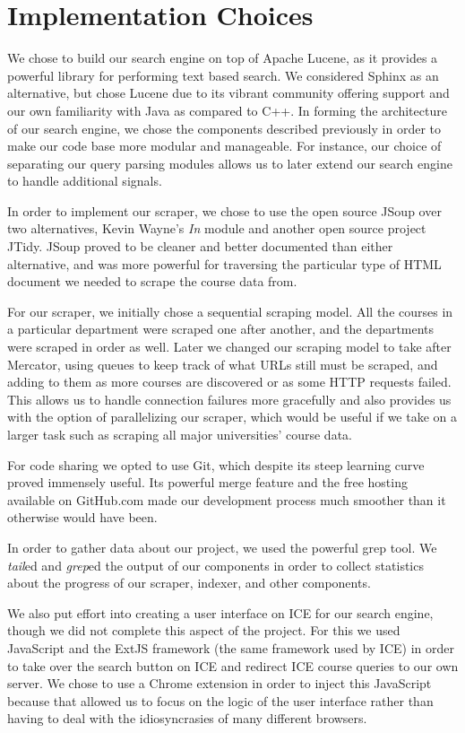 \documentclass[12pt,letterpaper]{article}
\begin{document}
\section{Implementation Choices}
We chose to build our search engine on top of Apache Lucene, as it provides a powerful library for performing text based search. We considered Sphinx as an alternative, but chose Lucene due to its vibrant community offering support and our own familiarity with Java as compared to C++. In forming the architecture of our search engine, we chose the components described previously in order to make our code base more modular and manageable. For instance, our choice of separating our query parsing modules allows us to later extend our search engine to handle additional signals.

In order to implement our scraper, we chose to use the open source JSoup over two alternatives, Kevin Wayne's \emph{In} module and another open source project JTidy. JSoup proved to be cleaner and better documented than either alternative, and was more powerful for traversing the particular type of HTML document we needed to scrape the course data from.

For our scraper, we initially chose a sequential scraping model. All the courses in a particular department were scraped one after another, and the departments were scraped in order as well. Later we changed our scraping model to take after Mercator, using queues to keep track of what URLs still must be scraped, and adding to them as more courses are discovered or as some HTTP requests failed. This allows us to handle connection failures more gracefully and also provides us with the option of parallelizing our scraper, which would be useful if we take on a larger task such as scraping all major universities' course data.

For code sharing we opted to use Git, which despite its steep learning curve proved immensely useful. Its powerful merge feature and the free hosting available on GitHub.com made our development process much smoother than it otherwise would have been.

In order to gather data about our project, we used the powerful grep tool. We \emph{tail}ed and \emph{grep}ed the output of our components in order to collect statistics about the progress of our scraper, indexer, and other components.

We also put effort into creating a user interface on ICE for our search engine, though we did not complete this aspect of the project. For this we used JavaScript and the ExtJS framework (the same framework used by ICE) in order to take over the search button on ICE and redirect ICE course queries to our own server. We chose to use a Chrome extension in order to inject this JavaScript because that allowed us to focus on the logic of the user interface rather than having to deal with the idiosyncrasies of many different browsers.
\end{document}
